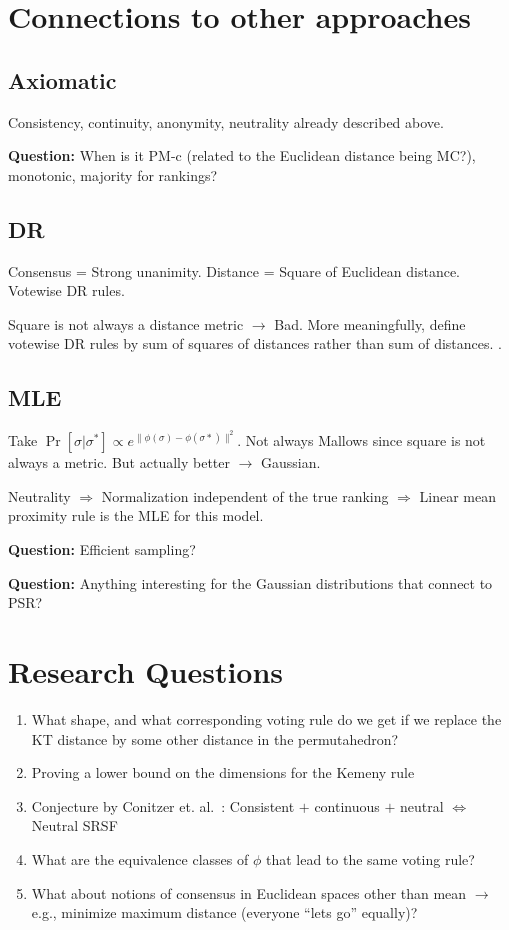 \documentclass[10pt,letterpaper]{article}
\begin{document}
\section{Connections to other approaches}
\subsection{Axiomatic}
Consistency, continuity, anonymity, neutrality already described above. 

{\bf Question:} When is it PM-c (related to the Euclidean distance being MC?), monotonic, majority for rankings?

\subsection{DR}
Consensus = Strong unanimity. Distance = Square of Euclidean distance. Votewise DR rules. 

Square is not always a distance metric $\rightarrow$ Bad. More meaningfully, define votewise DR rules by sum of squares of distances rather than sum of distances. . 

\subsection{MLE}
Take $\Pr[\sigma | \sigma^*] \propto e^{\|\phi(\sigma)-\phi(\sigma*)\|^2}$. Not always Mallows since square is not always a metric. But actually better $\rightarrow$ Gaussian. 

Neutrality $\Rightarrow$ Normalization independent of the true ranking $\Rightarrow$ Linear mean proximity rule is the MLE for this model. 

{\bf Question:} Efficient sampling?

{\bf Question:} Anything interesting for the Gaussian distributions that connect to PSR?

\section{Research Questions}
\begin{enumerate}
\item What shape, and what corresponding voting rule do we get if we replace the KT distance by some other distance in the permutahedron?
\item Proving a lower bound on the dimensions for the Kemeny rule
\item Conjecture by Conitzer et. al.~\cite{CRX09}: Consistent $+$ continuous $+$ neutral $\Leftrightarrow$ Neutral SRSF
\item What are the equivalence classes of $\phi$ that lead to the same voting rule?
\item What about notions of consensus in Euclidean spaces other than mean $\rightarrow$ e.g., minimize maximum distance (everyone ``lets go'' equally)?
\end{enumerate}


\begin{comment}
Mean proximity rule / generalized scoring rule / SRSF - Neutral $\Rightarrow$ SRSF iff MLE
{\bf Question:} (Linear) Mean Proximity Rules - Captures all ``pairwise comparison scoring rules''?
\end{comment}



\end{document}
